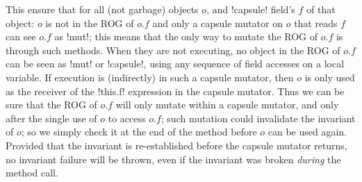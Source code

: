 \noindent This ensure that for all (not garbage) objects $o$, and \Q!capsule! field's $f$ of that object:
$o$ is not in the ROG of $o.f$ and
only a capsule mutator on $o$ that reads $f$ can see $o.f$ as \Q!mut!; this means that the only way to mutate the ROG of $o.f$ is through such methods. When they are not executing, no object in the ROG of $o.f$ can be seen as \Q!mut! or \Q!capsule!, using any sequence of field accesses on a local variable.
%
%
If execution is (indirectly) in such a capsule mutator, then $o$ is only used as the receiver of the \Q!this.f! expression in the capsule mutator.
Thus we can be sure that the ROG of $o.f$ will only mutate within a capsule mutator, and only after the single use of $o$ to access $o.f$; such mutation could invalidate the invariant of $o$; so we simply check it at the end of the method before $o$ can be used again. Provided that the invariant is re-established before the capsule mutator returns, no invariant failure will be thrown, even if the invariant was broken \emph{during} the method call.

